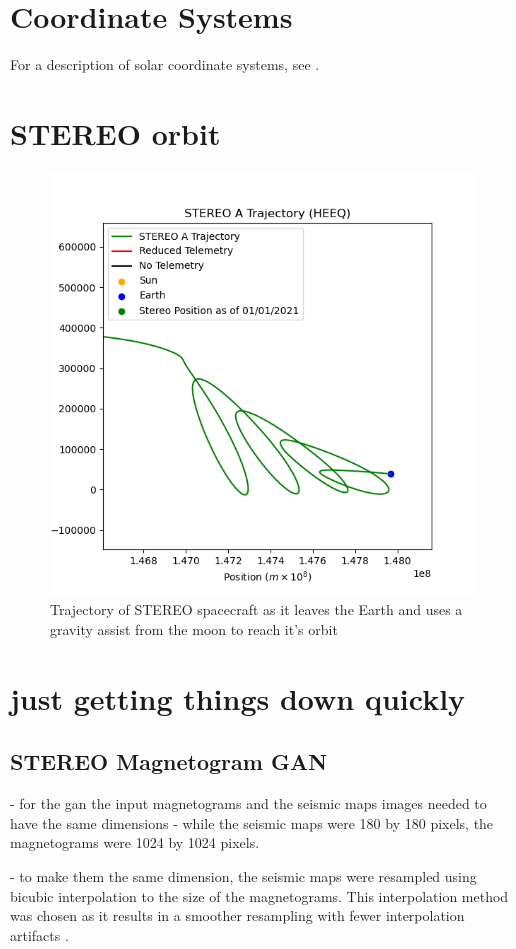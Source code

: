 \documentclass[11pt,a4paper,onecolumn]{report}
\begin{document}
\chapter{Coordinate Systems}
For a description of solar coordinate systems, see
\citet{thompson_w_t_coordinate_2006}.

\chapter{STEREO orbit}
\label{app:fun orbit}
\begin{figure}[ht]
  \centering
  \includegraphics[width=0.8\linewidth]{fun_orbit.png}
  \caption{Trajectory of STEREO spacecraft as it leaves the Earth and uses a gravity assist from the moon to reach it's orbit}
  \label{fig:fun_orbit}
\end{figure}

\chapter{just getting things down quickly}



\section{STEREO Magnetogram GAN}
- for the gan the input magnetograms and the seismic maps images needed to have
the same dimensions - while the seismic maps were 180 by 180 pixels, the
magnetograms were 1024 by 1024 pixels.




- to make them the same dimension, the seismic maps were resampled using bicubic
interpolation to the size of the magnetograms. This interpolation method was
chosen as it results in a smoother resampling with fewer interpolation artifacts
\citep{keys_cubic_1981}.
\end{document}
